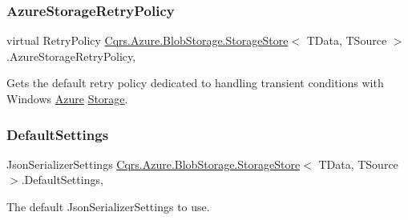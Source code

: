 \subsubsection{\texorpdfstring{Azure\+Storage\+Retry\+Policy}{AzureStorageRetryPolicy}}
{\footnotesize\ttfamily virtual Retry\+Policy \hyperlink{classCqrs_1_1Azure_1_1BlobStorage_1_1StorageStore}{Cqrs.\+Azure.\+Blob\+Storage.\+Storage\+Store}$<$ T\+Data, T\+Source $>$.Azure\+Storage\+Retry\+Policy\hspace{0.3cm}{\ttfamily [get]}, {\ttfamily [protected]}}



Gets the default retry policy dedicated to handling transient conditions with Windows \hyperlink{namespaceCqrs_1_1Azure}{Azure} \hyperlink{namespaceCqrs_1_1Azure_1_1Storage}{Storage}. 

\mbox{\label{classCqrs_1_1Azure_1_1BlobStorage_1_1StorageStore_ac5c27123fd0bf4d926a4865e2d6b0bdd_ac5c27123fd0bf4d926a4865e2d6b0bdd}} 
\subsubsection{\texorpdfstring{Default\+Settings}{DefaultSettings}}
{\footnotesize\ttfamily Json\+Serializer\+Settings \hyperlink{classCqrs_1_1Azure_1_1BlobStorage_1_1StorageStore}{Cqrs.\+Azure.\+Blob\+Storage.\+Storage\+Store}$<$ T\+Data, T\+Source $>$.Default\+Settings\hspace{0.3cm}{\ttfamily [static]}, {\ttfamily [get]}}



The default Json\+Serializer\+Settings to use. 

\mbox{\label{classCqrs_1_1Azure_1_1BlobStorage_1_1StorageStore_af298920154f31a7d0117facbb2f7cd54_af298920154f31a7d0117facbb2f7cd54}} 
